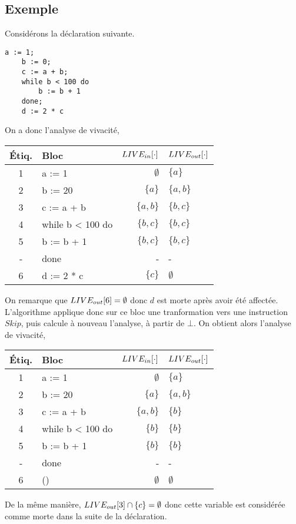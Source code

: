 \documentclass[a4paper, 12pt]{article}
\begin{document}
\subsection{Exemple}
\noindent
Considérons la déclaration suivante.
\begin{lstlisting}[tabsize=2]
	a := 1;
	b := 0;
	c := a + b;
	while b < 100 do
		b := b + 1
	done;
	d := 2 * c
\end{lstlisting}
On a donc l'analyse de vivacité,
\begin{center}
\begin{tabular}{||c|l|r|l||}
\hline
Étiq. & Bloc & $LIVE_{in}[\cdot]$ & $LIVE_{out}[\cdot]$ \\
\hline
1 & a := 1 & $\emptyset$ & $\{a\}$\\
2 & b := 20 & $\{a\}$ & $\{a, b\}$\\
3 & c := a + b & $\{a, b\}$ & $\{b, c\}$\\
4 & while b < 100 do & $\{b, c\}$ & $\{b, c\}$\\
5 & b := b + 1 & $\{b, c\}$ & $\{b, c\}$\\
- & done & - & -\\
6 & d := 2 * c & $\{c\}$ & $\emptyset$\\
\hline
\end{tabular}
\end{center}
On remarque que $LIVE_{out}[6] = \emptyset$ donc $d$ est morte après avoir été affectée. L'algorithme applique donc sur ce bloc
une tranformation vers une instruction $Skip$, puis calcule à nouveau l'analyse, à partir de $\bot$. On obtient alors l'analyse
de vivacité,
\begin{center}
	\begin{tabular}{||c|l|r|l||}
	\hline
	Étiq. & Bloc & $LIVE_{in}[\cdot]$ & $LIVE_{out}[\cdot]$ \\
	\hline
	1 & a := 1 & $\emptyset$ & $\{a\}$\\
	2 & b := 20 & $\{a\}$ & $\{a, b\}$\\
	3 & c := a + b & $\{a, b\}$ & $\{b\}$\\
	4 & while b < 100 do & $\{b\}$ & $\{b\}$\\
	5 & b := b + 1 & $\{b\}$ & $\{b\}$\\
	- & done & - & -\\
	6 & () & $\emptyset$ & $\emptyset$\\
	\hline
	\end{tabular}
\end{center}
De la même manière, $LIVE_{out}[3] \cap \{c\} = \emptyset$ donc cette variable est considérée comme morte dans la suite de la déclaration.
\end{document}
